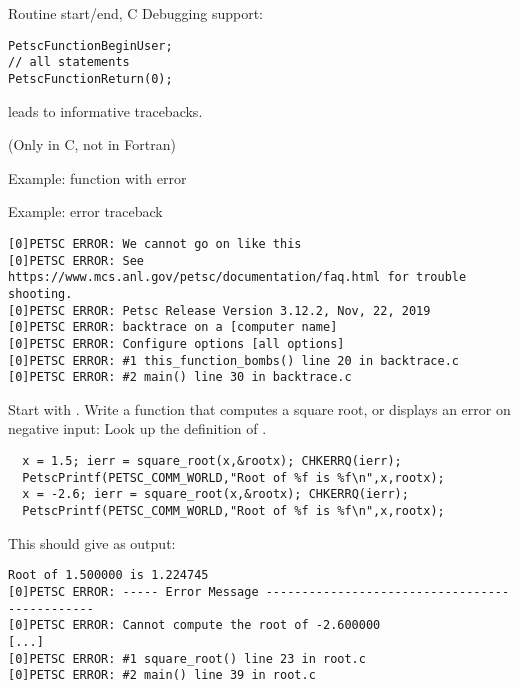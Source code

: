 \begin{c}
\begin{numberedframe}{Routine start/end, C}
Debugging support:
\begin{lstlisting}
PetscFunctionBeginUser;
// all statements
PetscFunctionReturn(0);
\end{lstlisting}
leads to informative tracebacks.

(Only in C, not in Fortran)
\end{numberedframe}
\end{c}

\begin{numberedframe}{Example: function with error}
\end{numberedframe}

\begin{numberedframe}{Example: error traceback}
\footnotesize
\begin{verbatim}
[0]PETSC ERROR: We cannot go on like this
[0]PETSC ERROR: See https://www.mcs.anl.gov/petsc/documentation/faq.html for trouble shooting.
[0]PETSC ERROR: Petsc Release Version 3.12.2, Nov, 22, 2019
[0]PETSC ERROR: backtrace on a [computer name]
[0]PETSC ERROR: Configure options [all options]
[0]PETSC ERROR: #1 this_function_bombs() line 20 in backtrace.c
[0]PETSC ERROR: #2 main() line 30 in backtrace.c
\end{verbatim}
\end{numberedframe}

\begin{exerciseframe}[root]
Start with . Write a function that computes a square root,
or displays an error on negative input:
Look up the definition of .
\begin{lstlisting}
  x = 1.5; ierr = square_root(x,&rootx); CHKERRQ(ierr);
  PetscPrintf(PETSC_COMM_WORLD,"Root of %f is %f\n",x,rootx);
  x = -2.6; ierr = square_root(x,&rootx); CHKERRQ(ierr);
  PetscPrintf(PETSC_COMM_WORLD,"Root of %f is %f\n",x,rootx);
\end{lstlisting}
This should give as output:

\begingroup \tiny
\begin{verbatim}
Root of 1.500000 is 1.224745
[0]PETSC ERROR: ----- Error Message ----------------------------------------------
[0]PETSC ERROR: Cannot compute the root of -2.600000
[...]
[0]PETSC ERROR: #1 square_root() line 23 in root.c
[0]PETSC ERROR: #2 main() line 39 in root.c
\end{verbatim}
\endgroup
\end{exerciseframe}


